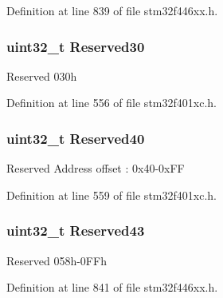 Definition at line 839 of file stm32f446xx.\+h.

\subsubsection[{\texorpdfstring{Reserved30}{Reserved30}}]{\setlength{\rightskip}{0pt plus 5cm}uint32\+\_\+t Reserved30}\hypertarget{struct_u_s_b___o_t_g___global_type_def_ad9882d3bf56ca5821b2453b1ee5d5fc2}{}\label{struct_u_s_b___o_t_g___global_type_def_ad9882d3bf56ca5821b2453b1ee5d5fc2}
Reserved 030h 

Definition at line 556 of file stm32f401xc.\+h.

\subsubsection[{\texorpdfstring{Reserved40}{Reserved40}}]{\setlength{\rightskip}{0pt plus 5cm}uint32\+\_\+t Reserved40}\hypertarget{struct_u_s_b___o_t_g___global_type_def_a2cec634078f0ae742890bc2439898224}{}\label{struct_u_s_b___o_t_g___global_type_def_a2cec634078f0ae742890bc2439898224}
Reserved Address offset \+: 0x40-\/0x\+FF 

Definition at line 559 of file stm32f401xc.\+h.

\subsubsection[{\texorpdfstring{Reserved43}{Reserved43}}]{\setlength{\rightskip}{0pt plus 5cm}uint32\+\_\+t Reserved43}\hypertarget{struct_u_s_b___o_t_g___global_type_def_a083dc7aa0b5dcf8cf22896d09a18b6d2}{}\label{struct_u_s_b___o_t_g___global_type_def_a083dc7aa0b5dcf8cf22896d09a18b6d2}
Reserved 058h-\/0\+F\+Fh 

Definition at line 841 of file stm32f446xx.\+h.

